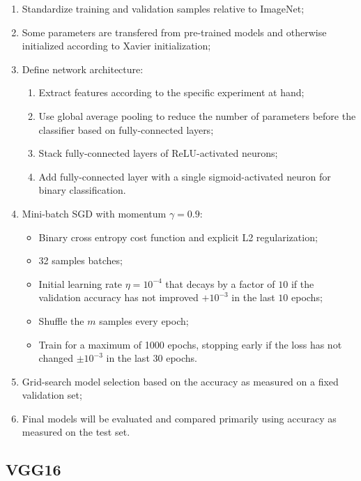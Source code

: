 \begin{enumerate}
    \item Standardize training and validation samples relative to ImageNet;
    \item Some parameters are transfered from pre-trained models and otherwise initialized according to Xavier initialization;
    \item Define network architecture:
        \begin{enumerate}
            \item Extract features according to the specific experiment at hand;
            \item Use global average pooling to reduce the number of parameters before the classifier based on fully-connected layers;
            \item Stack fully-connected layers of ReLU-activated neurons;
            \item Add fully-connected layer with a single sigmoid-activated neuron for binary classification.
        \end{enumerate}
    \item Mini-batch \ac{SGD} with momentum $\gamma = 0.9$:
        \begin{itemize}
            \item Binary cross entropy cost function and explicit L2 regularization;
            \item 32 samples batches;
            \item Initial learning rate $\eta = 10^{-4}$ that decays by a factor of $10$ if the validation accuracy has not improved $+10^{-3}$ in the last $10$ epochs;
            \item Shuffle the $m$ samples every epoch;
            \item Train for a maximum of 1000 epochs, stopping early if the loss has not changed $\pm 10^{-3}$ in the last $30$ epochs.
        \end{itemize}
    \item Grid-search model selection based on the accuracy as measured on a fixed validation set;
    \item Final models will be evaluated and compared primarily using accuracy as measured on the test set.
\end{enumerate}

\subsection{VGG16}


